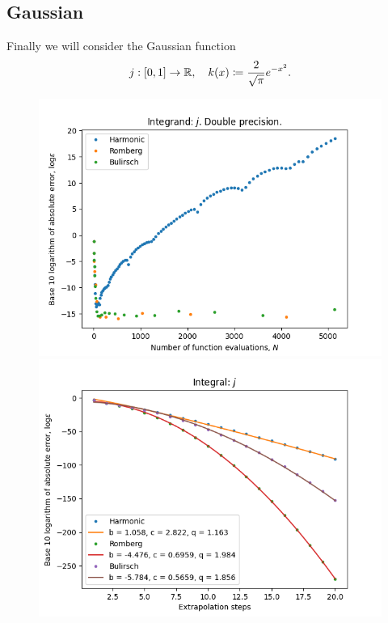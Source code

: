 \subsection{Gaussian}

Finally we will consider the Gaussian function
\[
j: [0,1]\rightarrow \mathbb{R}, \quad k(x) \coloneqq \frac{2}{\sqrt{\pi}} e^{-x^2}.
\]
\begin{figure}[H]
\centering
\begin{minipage}{0.45\textwidth}
\centering
\includegraphics[scale=0.45]{romberg_plots/gaussian.png}
\end{minipage}
\begin{minipage}{0.45\textwidth}
\centering
\includegraphics[scale=0.45]{romberg_plots/gaussian_hp_steps.png}
\end{minipage}
\end{figure}

